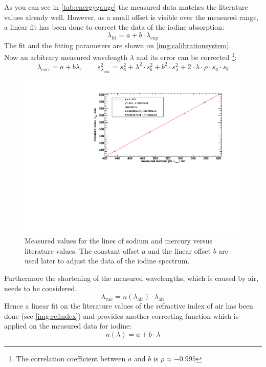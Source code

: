 As you can see in \autoref{tab:energygauge} the measured data matches the literature values already well.
However, as a small offset is visible over the measured range, a linear fit has been done
to correct the data of the iodine absorption:
\begin{equation}
  \lambda_{\text{lit}} = a + b \cdot \lambda_{\text{exp}}
\end{equation}
The fit and the fitting parameters are shown on \autoref{img:calibrationsystem}. \\
Now an arbitrary measured wavelength $\lambda$ and its error can be corrected \footnote{The correlation coefficient between $a$ and $b$ is $\rho \approx -0.995$}:
\begin{equation}
  \lambda_{\text{corr}} = a + b \lambda, \qquad s_{\lambda_{\text{corr}}}^2 = 
  s_a^2 + \lambda^2 \cdot s_b^2 + b^2 \cdot s_\lambda^2 + 2 \cdot \lambda \cdot \rho \cdot s_a \cdot s_b
\end{equation}

\begin{figure}[H]
\begin{center}
  \includegraphics[width=\textwidth]{../img/energy_gauge.pdf}
  \caption[---]{Measured values for the lines of sodium and mercury versus literature values.
  The constant offset $a$ and the linear offset $b$ are used later to adjust the data of the iodine spectrum.}
  \label{img:calibrationsystem}
\end{center}
\end{figure}

Furthermore the shortening of the measured wavelengths, which is caused by air, needs to be considered.
\begin{equation}
  \lambda_{\text{vac}} = n(\lambda_{\text{air}}) \cdot \lambda_{\text{air}}
\end{equation}
Hence a linear fit on the literature values of the refractive index of air has been done (see \autoref{img:refindex}) and provides another
correcting function which is applied on the measured data for iodine:
\begin{equation}
  n(\lambda) = a + b \cdot \lambda
\end{equation}

